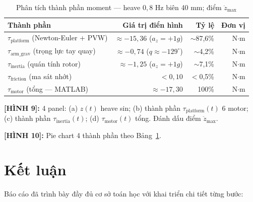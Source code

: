 \documentclass[12pt,a4paper]{article}
\newcommand{\figref}[2]{%
  \begin{mdframed}[
    linecolor=blue!50, linewidth=1pt,
    backgroundcolor=blue!3,
    innerleftmargin=6pt, innerrightmargin=6pt,
    innertopmargin=4pt, innerbottommargin=4pt
  ]
  {\small\bfseries [H\`{I}NH #1]:} {\small #2}
  \end{mdframed}
}
\begin{document}
\begin{table}[H]\centering
\caption{Phân tích thành phần moment --- heave $0{,}8$ Hz biên 40 mm; điểm $\ddot z_{\max}$}
\label{tab:tau_breakdown}
\begin{tabular}{@{}lrrr@{}}
\toprule
\bfseries Thành phần & \bfseries Giá trị điển hình & \bfseries Tỷ lệ & \bfseries Đơn vị \\
\midrule
$\tau_{\text{platform}}$ (Newton-Euler + PVW) & $\approx-15{,}36$ ($a_z=+1g$) & $\sim$87{,}6\% & N$\cdot$m \\
$\tau_{\text{arm\_grav}}$ (trọng lực tay quay) & $\approx-0{,}74$ ($q\approx-129^{\circ}$) & $\sim$4{,}2\% & N$\cdot$m \\
$\tau_{\text{inertia}}$ (quán tính rotor) & $\approx-1{,}25$ ($a_z=+1g$) & $\sim$7{,}1\% & N$\cdot$m \\
$\tau_{\text{friction}}$ (ma sát nhớt) & $<0{,}10$ & $<$0{,}5\% & N$\cdot$m \\
\midrule
$\tau_{\text{motor}}$ (tổng --- MATLAB) & $\approx-17{,}30$ & 100\% & N$\cdot$m \\
\bottomrule
\end{tabular}
\end{table}

\figref{9}{4 panel: (a) $z(t)$ heave sin; (b) thành phần $\tau_{\text{platform}}(t)$
6 motor; (c) thành phần $\tau_{\text{inertia}}(t)$; (d) $\tau_{\text{motor}}(t)$ tổng.
Đánh dấu điểm $\ddot z_{\max}$.}

\figref{10}{Pie chart 4 thành phần theo Bảng~\ref{tab:tau_breakdown}.}

\section{Kết luận}

Báo cáo đã trình bày đầy đủ cơ sở toán học với khai triển chi tiết từng bước:
\end{document}
